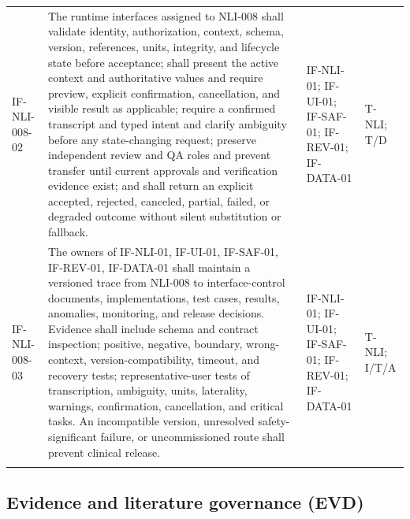 \documentclass[11pt,letterpaper]{article}
\begin{document}
\begin{scriptsize}
\begin{longtable}{@{}L{0.14\textwidth}L{0.49\textwidth}L{0.19\textwidth}L{0.10\textwidth}@{}}
\addlinespace[2pt]
\mbox{IF-NLI-008-02} & The runtime interfaces assigned to NLI-008 shall validate identity, authorization, context, schema, version, references, units, integrity, and lifecycle state before acceptance; shall present the active context and authoritative values and require preview, explicit confirmation, cancellation, and visible result as applicable; require a confirmed transcript and typed intent and clarify ambiguity before any state-changing request; preserve independent review and QA roles and prevent transfer until current approvals and verification evidence exist; and shall return an explicit accepted, rejected, canceled, partial, failed, or degraded outcome without silent substitution or fallback. & IF-NLI-01; IF-UI-01; IF-SAF-01; IF-REV-01; IF-DATA-01 & T-NLI; T\slash\allowbreak{}D \\
\addlinespace[2pt]
\mbox{IF-NLI-008-03} & The owners of IF-NLI-01, IF-UI-01, IF-SAF-01, IF-REV-01, IF-DATA-01 shall maintain a versioned trace from NLI-008 to interface-control documents, implementations, test cases, results, anomalies, monitoring, and release decisions. Evidence shall include schema and contract inspection; positive, negative, boundary, wrong-context, version-compatibility, timeout, and recovery tests; representative-user tests of transcription, ambiguity, units, laterality, warnings, confirmation, cancellation, and critical tasks. An incompatible version, unresolved safety-significant failure, or uncommissioned route shall prevent clinical release. & IF-NLI-01; IF-UI-01; IF-SAF-01; IF-REV-01; IF-DATA-01 & T-NLI; I\slash\allowbreak{}T\slash\allowbreak{}A \\
\addlinespace[2pt]
\end{longtable}
\end{scriptsize}

\subsection{Evidence and literature governance (EVD)}
\end{document}

